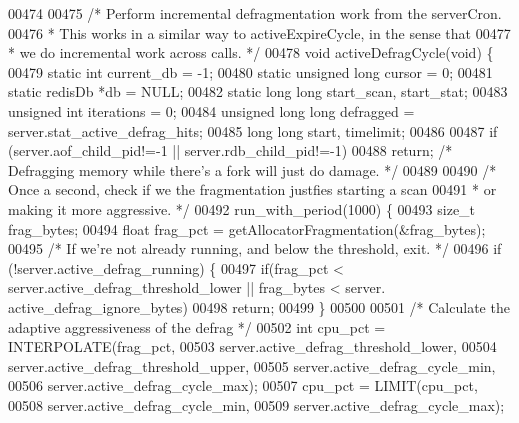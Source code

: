 \begin{DoxyCode}
00474 
00475 \textcolor{comment}{/* Perform incremental defragmentation work from the serverCron.}
00476 \textcolor{comment}{ * This works in a similar way to activeExpireCycle, in the sense that}
00477 \textcolor{comment}{ * we do incremental work across calls. */}
00478 \textcolor{keywordtype}{void} activeDefragCycle(\textcolor{keywordtype}{void}) \{
00479     \textcolor{keyword}{static} \textcolor{keywordtype}{int} current\_db = -1;
00480     \textcolor{keyword}{static} \textcolor{keywordtype}{unsigned} \textcolor{keywordtype}{long} cursor = 0;
00481     \textcolor{keyword}{static} redisDb *db = NULL;
00482     \textcolor{keyword}{static} \textcolor{keywordtype}{long} \textcolor{keywordtype}{long} start\_scan, start\_stat;
00483     \textcolor{keywordtype}{unsigned} \textcolor{keywordtype}{int} iterations = 0;
00484     \textcolor{keywordtype}{unsigned} \textcolor{keywordtype}{long} \textcolor{keywordtype}{long} defragged = server.stat\_active\_defrag\_hits;
00485     \textcolor{keywordtype}{long} \textcolor{keywordtype}{long} start, timelimit;
00486 
00487     \textcolor{keywordflow}{if} (server.aof\_child\_pid!=-1 || server.rdb\_child\_pid!=-1)
00488         \textcolor{keywordflow}{return}; \textcolor{comment}{/* Defragging memory while there's a fork will just do damage. */}
00489 
00490     \textcolor{comment}{/* Once a second, check if we the fragmentation justfies starting a scan}
00491 \textcolor{comment}{     * or making it more aggressive. */}
00492     run\_with\_period(1000) \{
00493         size\_t frag\_bytes;
00494         \textcolor{keywordtype}{float} frag\_pct = getAllocatorFragmentation(&frag\_bytes);
00495         \textcolor{comment}{/* If we're not already running, and below the threshold, exit. */}
00496         \textcolor{keywordflow}{if} (!server.active\_defrag\_running) \{
00497             \textcolor{keywordflow}{if}(frag\_pct < server.active\_defrag\_threshold\_lower || frag\_bytes < server.
      active\_defrag\_ignore\_bytes)
00498                 \textcolor{keywordflow}{return};
00499         \}
00500 
00501         \textcolor{comment}{/* Calculate the adaptive aggressiveness of the defrag */}
00502         \textcolor{keywordtype}{int} cpu\_pct = INTERPOLATE(frag\_pct,
00503                 server.active\_defrag\_threshold\_lower,
00504                 server.active\_defrag\_threshold\_upper,
00505                 server.active\_defrag\_cycle\_min,
00506                 server.active\_defrag\_cycle\_max);
00507         cpu\_pct = LIMIT(cpu\_pct,
00508                 server.active\_defrag\_cycle\_min,
00509                 server.active\_defrag\_cycle\_max);

\end{DoxyCode}
